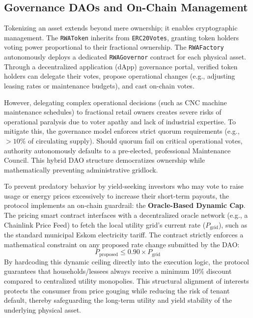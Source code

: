 \documentclass{Resources/bdlt-project}
\begin{document}
\subsection{Governance DAOs and On-Chain Management}
Tokenizing an asset extends beyond mere ownership; it enables cryptographic management. The \texttt{RWAToken} inherits from \texttt{ERC20Votes}, granting token holders voting power proportional to their fractional ownership. The \texttt{RWAFactory} autonomously deploys a dedicated \texttt{RWAGovernor} contract for each physical asset. Through a decentralized application (dApp) governance portal, verified token holders can delegate their votes, propose operational changes (e.g., adjusting leasing rates or maintenance budgets), and cast on-chain votes. 

However, delegating complex operational decisions (such as CNC machine maintenance schedules) to fractional retail owners creates severe risks of operational paralysis due to voter apathy and lack of industrial expertise. To mitigate this, the governance model enforces strict quorum requirements (e.g., $>10\%$ of circulating supply). Should quorum fail on critical operational votes, authority autonomously defaults to a pre-elected, professional Maintenance Council. This hybrid DAO structure democratizes ownership while mathematically preventing administrative gridlock.

To prevent predatory behavior by yield-seeking investors who may vote to raise usage or energy prices excessively to increase their short-term payouts, the protocol implements an on-chain guardrail: the \textbf{Oracle-Based Dynamic Cap}. The pricing smart contract interfaces with a decentralized oracle network (e.g., a Chainlink Price Feed) to fetch the local utility grid's current rate ($P_{\text{grid}}$), such as the standard municipal Eskom electricity tariff. The contract strictly enforces a mathematical constraint on any proposed rate change submitted by the DAO:
\begin{equation} \label{eqPriceCap}
P_{\text{proposed}} \le 0.90 \times P_{\text{grid}}
\end{equation}
By hardcoding this dynamic ceiling directly into the execution logic, the protocol guarantees that households/lessees always receive a minimum 10\% discount compared to centralized utility monopolies. This structural alignment of interests protects the consumer from price gouging while reducing the risk of tenant default, thereby safeguarding the long-term utility and yield stability of the underlying physical asset.
\end{document}
